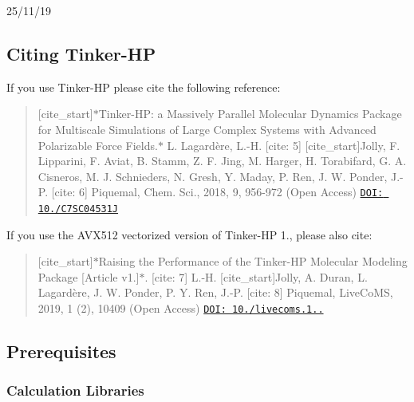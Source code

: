 25/11/19

\subsection*{Citing Tinker-\/\-H\-P}

If you use Tinker-\/\-H\-P please cite the following reference\-:

\begin{quotation}
\mbox{[}cite\-\_\-start\mbox{]}$\ast$\-Tinker-\/\-H\-P\-: a Massively Parallel Molecular Dynamics Package for Multiscale Simulations of Large Complex Systems with Advanced Polarizable Force Fields.$\ast$ L. Lagardère, L.-\/\-H. \mbox{[}cite\-: 5\mbox{]} \mbox{[}cite\-\_\-start\mbox{]}Jolly, F. Lipparini, F. Aviat, B. Stamm, Z. F. Jing, M. Harger, H. Torabifard, G. A. Cisneros, M. J. Schnieders, N. Gresh, Y. Maday, P. Ren, J. W. Ponder, J.-\/\-P. \mbox{[}cite\-: 6\mbox{]} Piquemal, Chem. Sci., 2018, 9, 956-\/972 (Open Access) \href{https://pubs.rsc.org/en/content/articlelanding/2018/sc/c7sc04531j}{\tt D\-O\-I\-: 10./\-C7\-S\-C04531\-J}

\end{quotation}


If you use the A\-V\-X512 vectorized version of Tinker-\/\-H\-P 1., please also cite\-:

\begin{quotation}
\mbox{[}cite\-\_\-start\mbox{]}$\ast$\-Raising the Performance of the Tinker-\/\-H\-P Molecular Modeling Package \mbox{[}Article v1.\mbox{]}$\ast$. \mbox{[}cite\-: 7\mbox{]} L.-\/\-H. \mbox{[}cite\-\_\-start\mbox{]}Jolly, A. Duran, L. Lagardère, J. W. Ponder, P. Y. Ren, J.-\/\-P. \mbox{[}cite\-: 8\mbox{]} Piquemal, Live\-Co\-M\-S, 2019, 1 (2), 10409 (Open Access) \href{https://vecomsjournal.org/article/10409-raising-the-performance-of-the-tinker-hp-molecular-modeling-package-article-v1-0}{\tt D\-O\-I\-: 10./livecoms.1..}

\end{quotation}




\subsection*{Prerequisites}

\subsubsection*{Calculation Libraries}

